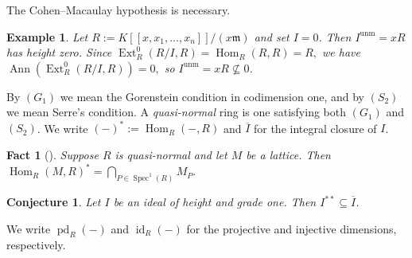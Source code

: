 \documentclass[11pt,a4paper]{amsart}
\numberwithin{equation}{section}
\newtheorem{fact}[theorem]{Fact}
\newtheorem{example}[theorem]{Example}
\newtheorem{conjecture}[theorem]{Conjecture}
\DeclareMathOperator{\Ann}{Ann}\DeclareMathOperator{\ann}{Ann}
\DeclareMathOperator{\unm}{unm}
\DeclareMathOperator{\Spec}{Spec}
\DeclareMathOperator{\pd}{pd}
\DeclareMathOperator{\Ext}{Ext}
\DeclareMathOperator{\Hom}{Hom}
\DeclareMathOperator{\id}{id}
\newcommand{\fm}{\mathfrak{m}}
\begin{document}
The Cohen–Macaulay hypothesis is necessary.

\begin{example}
	Let $R:=K[[x,x_1,\ldots,x_n]]/(x\fm)$ and set $I=0$. Then $I^{\unm}=xR$ has height zero. Since
	\(
	\Ext^{0}_R(R/I ,R)=\Hom_R(R,R)=R,
	\)
	we have
	\(
	\Ann(\Ext^{0}_R(R/I ,R))=0,
	\)
	so $I^{\unm}=xR\nsubseteq 0$.
\end{example}

By $(G_1)$ we mean the Gorenstein condition in codimension one, and by $(S_2)$ we mean Serre's condition. A \emph{quasi-normal} ring is one satisfying both $(G_1)$ and $(S_2)$. We write $(-)^\ast:=\Hom_R(-,R)$ and $\overline{I}$ for the integral closure of $I$.

\begin{fact}[{\cite[4.2]{Fos}}]\label{fos}
	Suppose $R$ is quasi-normal and let $M$ be a lattice. Then
	\(
	\Hom_R(M,R)^\ast = \bigcap_{P \in \Spec^1(R)} M_P .
	\)
\end{fact}

\begin{conjecture}\label{26}
	Let \( I \) be an ideal of height and grade one. Then \( I^{**} \subseteq \overline{I} \).
\end{conjecture}

We write $\pd_R(-)$ and $\id_R(-)$ for the projective and injective dimensions, respectively.
\end{document}
